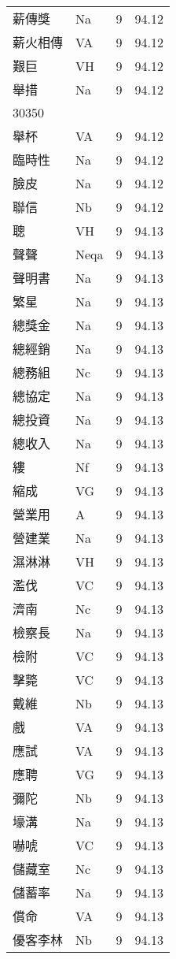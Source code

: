 \documentclass[twocolumn]{book}
\begin{document}
\begin{supertabular}{llrr}
薪傳獎 & Na & 9 &  94.12\\
薪火相傳 & VA & 9 &  94.12\\
艱巨 & VH & 9 &  94.12\\
舉措 & Na & 9 &  94.12\\
30350\\
舉杯 & VA & 9 &  94.12\\
臨時性 & Na & 9 &  94.12\\
臉皮 & Na & 9 &  94.12\\
聯信 & Nb & 9 &  94.12\\
聰 & VH & 9 &  94.13\\
聲聲 & Neqa & 9 &  94.13\\
聲明書 & Na & 9 &  94.13\\
繁星 & Na & 9 &  94.13\\
總獎金 & Na & 9 &  94.13\\
總經銷 & Na & 9 &  94.13\\
總務組 & Nc & 9 &  94.13\\
總協定 & Na & 9 &  94.13\\
總投資 & Na & 9 &  94.13\\
總收入 & Na & 9 &  94.13\\
縷 & Nf & 9 &  94.13\\
縮成 & VG & 9 &  94.13\\
營業用 & A & 9 &  94.13\\
營建業 & Na & 9 &  94.13\\
濕淋淋 & VH & 9 &  94.13\\
濫伐 & VC & 9 &  94.13\\
濟南 & Nc & 9 &  94.13\\
檢察長 & Na & 9 &  94.13\\
檢附 & VC & 9 &  94.13\\
擊斃 & VC & 9 &  94.13\\
戴維 & Nb & 9 &  94.13\\
戲 & VA & 9 &  94.13\\
應試 & VA & 9 &  94.13\\
應聘 & VG & 9 &  94.13\\
彌陀 & Nb & 9 &  94.13\\
壕溝 & Na & 9 &  94.13\\
嚇唬 & VC & 9 &  94.13\\
儲藏室 & Nc & 9 &  94.13\\
儲蓄率 & Na & 9 &  94.13\\
償命 & VA & 9 &  94.13\\
優客李林 & Nb & 9 &  94.13\\

\end{supertabular}
\end{document}
